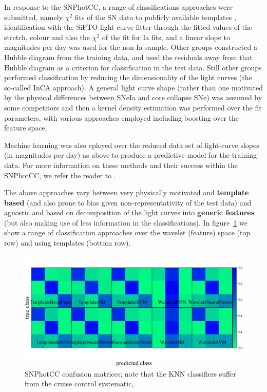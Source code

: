In response to the SNPhotCC, a range of classifications approaches were submitted, namely $\chi^{2}$ fits of the SN data to publicly available templates \citep[see the][templates,]{2002PASP..114..803N}, identification with the SiFTO light curve fitter \citep{2008ApJ...681..482C} through the fitted values of the stretch, colour and also the $\chi^{2}$ of the fit for Ia fits, and a linear slope to magnitudes per day was used for the non-Ia sample.
Other groups constructed a Hubble diagram from the training data, and used the residuals away from that Hubble diagram as a criterion for classification in the test data.
Still other groups performed classification by reducing the dimensionality of the light curves (the so-called InCA approach).
A general light curve shape (rather than one motivated by the physical differences between SNeIa and core collapse SNe) was assumed by some competitors and then a kernel density estimation was performed over the fit parameters, with various approaches employed including boosting over the feature space.

Machine learning was also eployed over the reduced data set of light-curve slopes (in magnitudes per day) as above to produce a predictive model for the training data.
For more information on these methods and their success within the SNPhotCC, we refer the reader to \cite{kessler_results_2010}.

The above approaches vary between very physically motivated and \textbf{template based} (and also prone to bias given non-representativity of the test data) and agnostic and based on decomposition of the light curves into \textbf{generic features} (but also making use of less information in the classifications).
In figure~\ref{fig:snphotcc_cm} we show a range of classification approaches over the wavelet (feature) space (top row) and using templates (bottom row).

\begin{figure}
	\begin{center}
    \includegraphics[width=\textwidth]{./fig/all_snphotcc_cm.png}
		\caption{SNPhotCC confusion matrices; note that the KNN classifiers suffer from the cruise control systematic, }
		\label{fig:snphotcc_cm}
	\end{center}
\end{figure}



